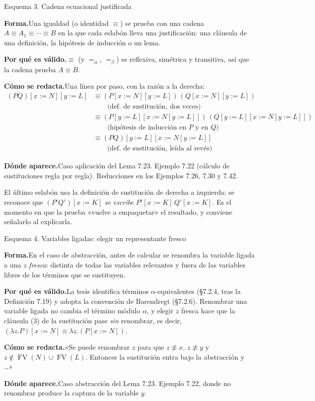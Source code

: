 \documentclass[11pt,a4paper]{article}
\newcommand{\forma}{\par\noindent\textbf{Forma.}\enspace}
\newcommand{\porque}{\par\smallskip\noindent\textbf{Por qué es válido.}\enspace}
\newcommand{\plantilla}{\par\smallskip\noindent\textbf{Cómo se redacta.}\enspace}
\newcommand{\donde}{\par\smallskip\noindent\textbf{Dónde aparece.}\enspace}
\newcommand{\FV}{\operatorname{FV}}
\newcommand{\beq}{=_\beta}
\newcommand{\aeq}{=_\alpha}
\begin{document}
\begin{esquema}{Esquema 3. Cadena ecuacional justificada}
\forma Una igualdad (o identidad \(\equiv\)) se prueba con una cadena
\(A\equiv A_1\equiv\cdots\equiv B\) en la que cada eslabón lleva una
justificación: una cláusula de una definición, la hipótesis de inducción o un
lema.

\porque \(\equiv\) (y \(\aeq\), \(\beq\)) es reflexiva, simétrica y
transitiva, así que la cadena prueba \(A\equiv B\).

\plantilla Una línea por paso, con la razón a la derecha:
\[
\begin{aligned}
(PQ)[x:=N][y:=L]
&\equiv (P[x:=N][y:=L])\,(Q[x:=N][y:=L])\\
&\qquad\text{(def. de sustitución, dos veces)}\\
&\equiv (P[y:=L][x:=N[y:=L]])\,(Q[y:=L][x:=N[y:=L]])\\
&\qquad\text{(hipótesis de inducción en \(P\) y en \(Q\))}\\
&\equiv (PQ)[y:=L][x:=N[y:=L]]\\
&\qquad\text{(def. de sustitución, leída al revés)}
\end{aligned}
\]

\donde Caso aplicación del Lema 7.23. Ejemplo 7.22 (cálculo de sustituciones
regla por regla). Reducciones en los Ejemplos 7.26, 7.30 y 7.42.
\end{esquema}

\begin{nota}
El último eslabón usa la definición de sustitución de derecha a izquierda:
se reconoce que \((P'Q')[x:=K]\) \emph{se escribe} \(P'[x:=K]\,Q'[x:=K]\).
Es el momento en que la prueba «vuelve a empaquetar» el resultado, y conviene
señalarlo al explicarla.
\end{nota}

\begin{esquema}{Esquema 4. Variables ligadas: elegir un representante fresco}
\forma En el caso de abstracción, antes de calcular se renombra la variable
ligada a una \(z\) \emph{fresca}: distinta de todas las variables relevantes y
fuera de las variables libres de los términos que se sustituyen.

\porque La tesis identifica términos \(\alpha\)-equivalentes (§7.2.4, tras la
Definición 7.19) y adopta la convención de Barendregt (§7.2.6). Renombrar una
variable ligada no cambia el término módulo \(\alpha\), y elegir \(z\) fresca
hace que la cláusula (3) de la sustitución pase \emph{sin} renombrar, es decir,
\((\lambda z.P)[x:=N]\equiv\lambda z.(P[x:=N])\).

\plantilla «Se puede renombrar \(z\) para que \(z\not\equiv x\),
\(z\not\equiv y\) y \(z\notin\FV(N)\cup\FV(L)\). Entonces la sustitución entra
bajo la abstracción y \dots»

\donde Caso abstracción del Lema 7.23. Ejemplo 7.22, donde no renombrar
produce la captura de la variable \(y\).
\end{esquema}
\end{document}
